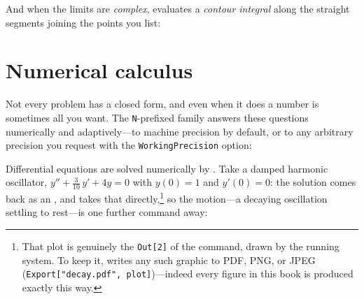 \begin{codepairs}
\end{codepairs}

And when the limits are \emph{complex},  evaluates a \emph{contour
integral} along the straight segments joining the points you list:

\begin{codepairs}
\end{codepairs}

\section{Numerical calculus}
\label{sec:intro-numcalc}

Not every problem has a closed form, and even when it does a number is sometimes all
you want. The \texttt{N}-prefixed family answers these questions numerically and
adaptively---to machine precision by default, or to any arbitrary precision you request
with the \texttt{WorkingPrecision} option:

\begin{codepairs}
\end{codepairs}

Differential equations are solved numerically by . Take a damped harmonic
oscillator, $y'' + \tfrac{3}{10}\,y' + 4y = 0$ with $y(0)=1$ and $y'(0)=0$: the solution
comes back as an , and  takes that
directly,\footnote{That plot is genuinely the \texttt{Out[2]} of the  command,
drawn by the running system. To keep it,  writes any such graphic to PDF, PNG,
or JPEG (\texttt{Export["decay.pdf", plot]})---indeed every figure in this book is
produced exactly this way.} so the motion---a decaying oscillation settling to rest---is
one further command away:

